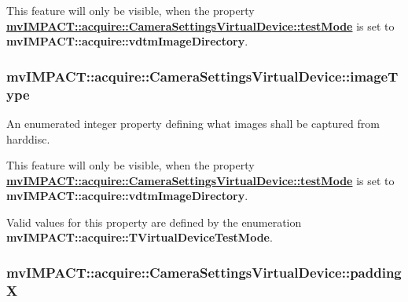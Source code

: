 This feature will only be visible, when the property {\bfseries \hyperlink{classmv_i_m_p_a_c_t_1_1acquire_1_1_camera_settings_virtual_device_a804a5ef868aaf896d39986547d8407f6}{mv\+I\+M\+P\+A\+C\+T\+::acquire\+::\+Camera\+Settings\+Virtual\+Device\+::test\+Mode}} is set to {\bfseries mv\+I\+M\+P\+A\+C\+T\+::acquire\+::vdtm\+Image\+Directory}. \hypertarget{classmv_i_m_p_a_c_t_1_1acquire_1_1_camera_settings_virtual_device_aa2e7f03546b993681065cf0e5ff870dc}{
\subsubsection[{image\+Type}]{ mv\+I\+M\+P\+A\+C\+T\+::acquire\+::\+Camera\+Settings\+Virtual\+Device\+::image\+Type}}\label{classmv_i_m_p_a_c_t_1_1acquire_1_1_camera_settings_virtual_device_aa2e7f03546b993681065cf0e5ff870dc}


An enumerated integer property defining what images shall be captured from harddisc. 

This feature will only be visible, when the property {\bfseries \hyperlink{classmv_i_m_p_a_c_t_1_1acquire_1_1_camera_settings_virtual_device_a804a5ef868aaf896d39986547d8407f6}{mv\+I\+M\+P\+A\+C\+T\+::acquire\+::\+Camera\+Settings\+Virtual\+Device\+::test\+Mode}} is set to {\bfseries mv\+I\+M\+P\+A\+C\+T\+::acquire\+::vdtm\+Image\+Directory}.

Valid values for this property are defined by the enumeration {\bfseries mv\+I\+M\+P\+A\+C\+T\+::acquire\+::\+T\+Virtual\+Device\+Test\+Mode}. \hypertarget{classmv_i_m_p_a_c_t_1_1acquire_1_1_camera_settings_virtual_device_a0aeed2e2b157d75a0e3f6fe1914c3328}{
\subsubsection[{padding\+X}]{ mv\+I\+M\+P\+A\+C\+T\+::acquire\+::\+Camera\+Settings\+Virtual\+Device\+::padding\+X}}\label{classmv_i_m_p_a_c_t_1_1acquire_1_1_camera_settings_virtual_device_a0aeed2e2b157d75a0e3f6fe1914c3328}


